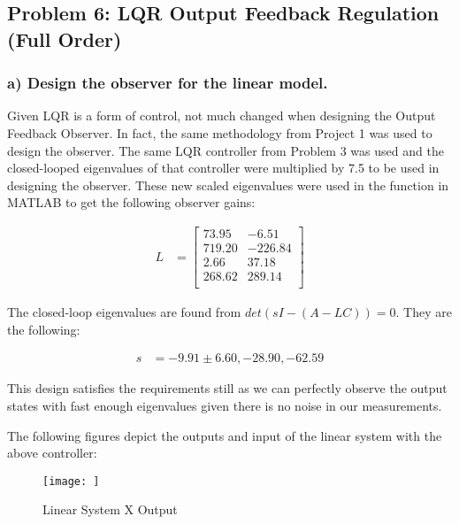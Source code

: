 \subsection*{Problem 6: LQR Output Feedback Regulation (Full Order)}
\subsubsection*{a) Design the observer for the linear model.}


Given LQR is a form of control, not much changed when designing the Output Feedback Observer. In fact, the same methodology from Project 1 was used to design the observer. The same LQR controller from Problem 3 was used and the closed-looped eigenvalues of that controller were multiplied by 7.5 to be used in designing the observer. These new scaled eigenvalues were used in the  function in MATLAB to get the following observer gains:

\begin{equation*}
    \begin{split}
        L & =
        \begin{bmatrix}
            73.95  & -6.51   \\
            719.20 & -226.84 \\
            2.66   & 37.18   \\
            268.62 & 289.14  \\
        \end{bmatrix}
    \end{split}
\end{equation*}

The closed-loop eigenvalues are found from $det(sI-(A-LC))=0$. They are the following:

\begin{equation*}
    \begin{split}
        s & = -9.91\pm6.60, -28.90, -62.59
    \end{split}
\end{equation*}

This design satisfies the requirements still as we can perfectly observe the output states with fast enough eigenvalues given there is no noise in our measurements.

The following figures depict the outputs and input of the linear system with the above controller:

\begin{figure}[!ht]
    \centering
    \texttt{[image: ]}
    \caption{Linear System X Output}
    \label{}
\end{figure}

